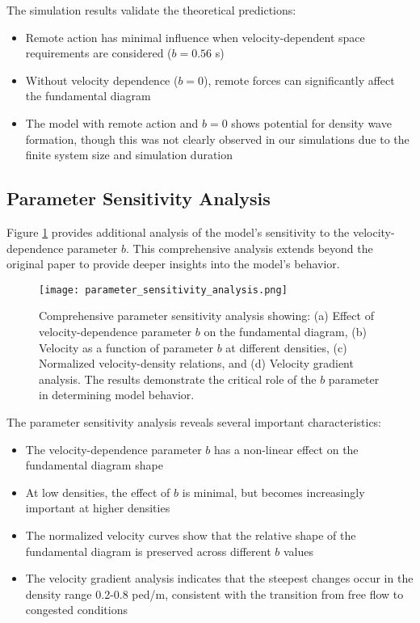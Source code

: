 \documentclass[12pt,a4paper]{article}
\begin{document}
The simulation results validate the theoretical predictions:

\begin{itemize}
\item Remote action has minimal influence when velocity-dependent space requirements are considered ($b = 0.56$ s)
\item Without velocity dependence ($b = 0$), remote forces can significantly affect the fundamental diagram
\item The model with remote action and $b = 0$ shows potential for density wave formation, though this was not clearly observed in our simulations due to the finite system size and simulation duration
\end{itemize}

\subsection{Parameter Sensitivity Analysis}

Figure \ref{fig:parameter_sensitivity} provides additional analysis of the model's sensitivity to the velocity-dependence parameter $b$. This comprehensive analysis extends beyond the original paper to provide deeper insights into the model's behavior.

\begin{figure}[H]
\centering
\texttt{[image: parameter\_sensitivity\_analysis.png]}
\caption{Comprehensive parameter sensitivity analysis showing: (a) Effect of velocity-dependence parameter $b$ on the fundamental diagram, (b) Velocity as a function of parameter $b$ at different densities, (c) Normalized velocity-density relations, and (d) Velocity gradient analysis. The results demonstrate the critical role of the $b$ parameter in determining model behavior.}
\label{fig:parameter_sensitivity}
\end{figure}

The parameter sensitivity analysis reveals several important characteristics:

\begin{itemize}
\item The velocity-dependence parameter $b$ has a non-linear effect on the fundamental diagram shape
\item At low densities, the effect of $b$ is minimal, but becomes increasingly important at higher densities
\item The normalized velocity curves show that the relative shape of the fundamental diagram is preserved across different $b$ values
\item The velocity gradient analysis indicates that the steepest changes occur in the density range 0.2-0.8 ped/m, consistent with the transition from free flow to congested conditions
\end{itemize}
\end{document}
